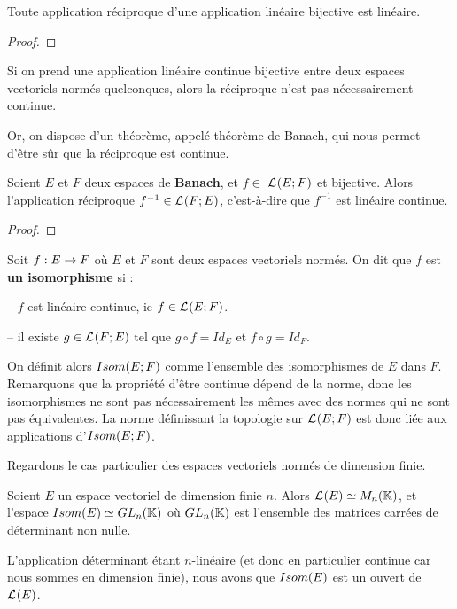 \begin{proposition}
	Toute application réciproque d'une application linéaire bijective est
	linéaire.
\end{proposition}

\ifdefined\outputproof
\begin{proof}

\end{proof}
\fi

Si on prend une application linéaire continue bijective entre deux espaces
vectoriels normés quelconques, alors la réciproque n'est pas nécessairement
continue.

Or, on dispose d'un théorème, appelé théorème de Banach, qui nous permet d'être
sûr que la réciproque est continue.

\begin{theorem} [Banach]
	\label{theorem_banach_isomorphism}
	Soient $E$ et $F$ deux espaces de \textbf{Banach}, et $f \in$
	$\mathcal{L}_{}(E; F)$ et bijective.
	Alors l'application réciproque $f^{-1} \in \mathcal{L}_{}(F; E)$,
	c'est-à-dire que $f^{-1}$ est linéaire continue.
\end{theorem}

\ifdefined\outputproof
\begin{proof}

\end{proof}
\fi

\begin{definition}
\label{definition:isomorphisme}
	Soit $f : E \rightarrow F$ où $E$ et $F$ sont deux espaces vectoriels
	normés.
	On dit que $f$ est \textbf{un isomorphisme} si :

	-- $f$ est linéaire continue, ie $f \in \mathcal{L}_{}(E; F)$.

	-- il existe $g \in \mathcal{L}_{}(F; E)$ tel que $g \circ f = Id_{E}$ et
	$f \circ g = Id_{F}$.
\end{definition}

On définit alors $Isom(E; F)$ comme l'ensemble des isomorphismes de $E$ dans
$F$.
Remarquons que la propriété d'être continue dépend de la norme, donc les
isomorphismes ne sont pas nécessairement les mêmes avec des normes qui ne sont
pas équivalentes. La norme définissant la topologie sur $\mathcal{L}_{}(E; F)$
est donc liée aux applications d'$Isom(E; F)$.

Regardons le cas particulier des espaces vectoriels normés de dimension finie.

\begin{remarque}
	Soient $E$ un espace vectoriel de dimension finie $n$. Alors
	$\mathcal{L}_{}(E) \simeq M_{n}(\mathbb{K})$, et l'espace
	$Isom(E) \simeq GL_{n}(\mathbb{K})$ où
	$GL_{n}(\mathbb{K})$ est l'ensemble des matrices carrées
	de déterminant non nulle.

	L'application déterminant étant $n$-linéaire (et donc en particulier
	continue car nous sommes en dimension finie), nous avons que $Isom(E)$
	est un ouvert de $\mathcal{L}_{}(E)$.
\end{remarque}

